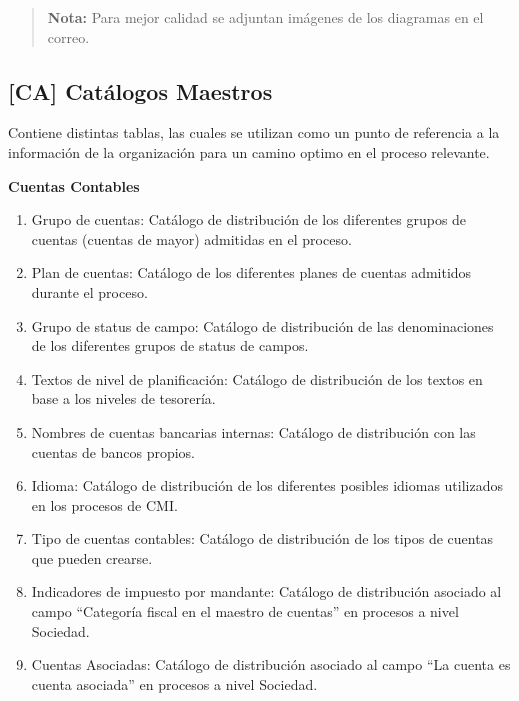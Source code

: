 \begin{quote}
  \textbf{Nota:} Para mejor calidad se adjuntan imágenes de los diagramas en el correo.
\end{quote}

\subsection{[CA] Catálogos Maestros}

Contiene distintas tablas, las cuales se utilizan como un punto de referencia a la información de la organización para un camino optimo en el proceso relevante.

{\centering
\textbf{Cuentas Contables}\par}

\begin{enumerate}

    \item Grupo de cuentas: Catálogo de distribución de los diferentes grupos de cuentas (cuentas de mayor) admitidas en el proceso.
    
    \item Plan de cuentas: Catálogo de los diferentes planes de cuentas admitidos durante el proceso.
    
    \item Grupo de status de campo: Catálogo de distribución de las denominaciones de los diferentes grupos de status de campos.
    
    \item Textos de nivel de planificación: Catálogo de distribución de los textos en base a los niveles de tesorería.
    
    \item Nombres de cuentas bancarias internas: Catálogo de distribución con las cuentas de bancos propios.

    \item Idioma: Catálogo de distribución de los diferentes posibles idiomas utilizados en los procesos de CMI.

    \item Tipo de cuentas contables: Catálogo de distribución de los tipos de cuentas que pueden crearse.

    \item Indicadores de impuesto por mandante: Catálogo de distribución asociado al campo “Categoría fiscal en el maestro de cuentas” en procesos a nivel Sociedad.

    \item Cuentas Asociadas: Catálogo de distribución asociado al campo “La cuenta es cuenta asociada” en procesos a nivel Sociedad.


\end{enumerate}
